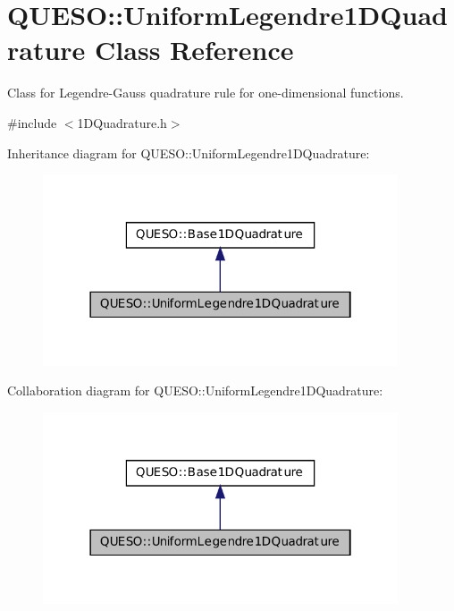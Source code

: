 \hypertarget{class_q_u_e_s_o_1_1_uniform_legendre1_d_quadrature}{\section{Q\-U\-E\-S\-O\-:\-:Uniform\-Legendre1\-D\-Quadrature Class Reference}
\label{class_q_u_e_s_o_1_1_uniform_legendre1_d_quadrature}
}


Class for Legendre-\/\-Gauss quadrature rule for one-\/dimensional functions.  




{\ttfamily \#include $<$1\-D\-Quadrature.\-h$>$}



Inheritance diagram for Q\-U\-E\-S\-O\-:\-:Uniform\-Legendre1\-D\-Quadrature\-:
\nopagebreak
\begin{figure}[H]
\begin{center}
\leavevmode
\includegraphics[width=298pt]{class_q_u_e_s_o_1_1_uniform_legendre1_d_quadrature__inherit__graph}
\end{center}
\end{figure}


Collaboration diagram for Q\-U\-E\-S\-O\-:\-:Uniform\-Legendre1\-D\-Quadrature\-:
\nopagebreak
\begin{figure}[H]
\begin{center}
\leavevmode
\includegraphics[width=298pt]{class_q_u_e_s_o_1_1_uniform_legendre1_d_quadrature__coll__graph}
\end{center}
\end{figure}
